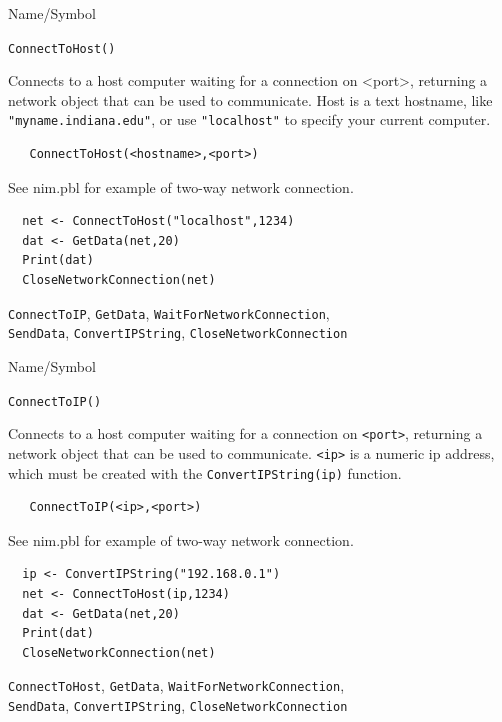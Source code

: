 \begin{desc}{Name/Symbol}
\item[Name/Symbol]	\verb+ConnectToHost()+

\item[Description]	Connects to a host computer waiting for a
  connection on <port>, returning a network object that can be used to
  communicate.  Host is a text hostname, like \verb+"myname.indiana.edu"+, or
  use \verb+"localhost"+ to specify your current computer.

\item[Usage]
\begin{verbatim}
   ConnectToHost(<hostname>,<port>)
\end{verbatim}

\item[Example]	

  See nim.pbl for example of two-way network connection.
\begin{verbatim}
  net <- ConnectToHost("localhost",1234)
  dat <- GetData(net,20)
  Print(dat)
  CloseNetworkConnection(net)
\end{verbatim}

\item[See Also]
  \verb+ConnectToIP+, \verb+GetData+, 
\verb+WaitForNetworkConnection+,\\
 \verb+SendData+, \verb+ConvertIPString+, \verb+CloseNetworkConnection+
\end{desc}



\begin{desc}{Name/Symbol}
\item[Name/Symbol]	\verb+ConnectToIP()+

\item[Description]	Connects to a host computer waiting for a
  connection on \verb+<port>+, returning a network object that can be used to
  communicate.  \verb+<ip>+ is a numeric ip address, which must be
  created with the \verb+ConvertIPString(ip)+ function. 

\item[Usage]
\begin{verbatim}
   ConnectToIP(<ip>,<port>)
\end{verbatim}

\item[Example]	

  See nim.pbl for example of two-way network connection.
\begin{verbatim}
  ip <- ConvertIPString("192.168.0.1")
  net <- ConnectToHost(ip,1234)
  dat <- GetData(net,20)
  Print(dat)
  CloseNetworkConnection(net)
\end{verbatim}

\item[See Also]
  \verb+ConnectToHost+, \verb+GetData+, \verb+WaitForNetworkConnection+,\\
   \verb+SendData+, \verb+ConvertIPString+, \verb+CloseNetworkConnection+
\end{desc}





